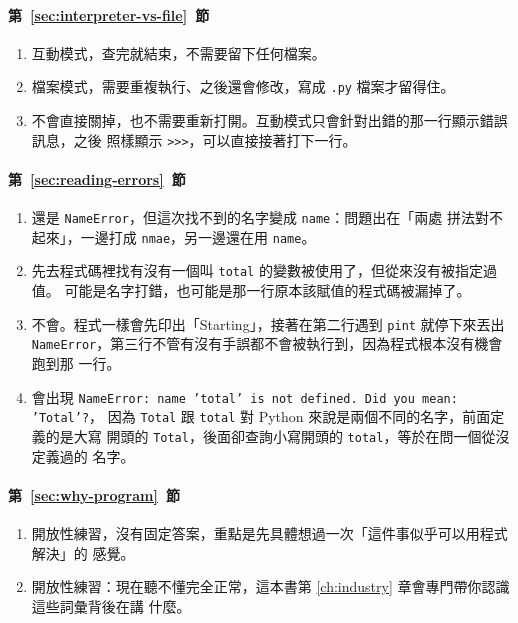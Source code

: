 \paragraph{第~\ref{sec:interpreter-vs-file}~節}
\begin{enumerate}
\item 互動模式，查完就結束，不需要留下任何檔案。
\item 檔案模式，需要重複執行、之後還會修改，寫成 \texttt{.py} 檔案才留得住。
\item 不會直接關掉，也不需要重新打開。互動模式只會針對出錯的那一行顯示錯誤訊息，之後
照樣顯示 \texttt{>>>}，可以直接接著打下一行。
\end{enumerate}

\paragraph{第~\ref{sec:reading-errors}~節}
\begin{enumerate}
\item 還是 \texttt{NameError}，但這次找不到的名字變成 \texttt{name}：問題出在「兩處
拼法對不起來」，一邊打成 \texttt{nmae}，另一邊還在用 \texttt{name}。
\item 先去程式碼裡找有沒有一個叫 \texttt{total} 的變數被使用了，但從來沒有被指定過值。
可能是名字打錯，也可能是那一行原本該賦值的程式碼被漏掉了。
\item 不會。程式一樣會先印出「Starting」，接著在第二行遇到 \texttt{pint} 就停下來丟出
\texttt{NameError}，第三行不管有沒有手誤都不會被執行到，因為程式根本沒有機會跑到那
一行。
\item 會出現 \texttt{NameError: name 'total' is not defined. Did you mean: 'Total'?}，
因為 \texttt{Total} 跟 \texttt{total} 對 Python 來說是兩個不同的名字，前面定義的是大寫
開頭的 \texttt{Total}，後面卻查詢小寫開頭的 \texttt{total}，等於在問一個從沒定義過的
名字。
\end{enumerate}

\paragraph{第~\ref{sec:why-program}~節}
\begin{enumerate}
\item 開放性練習，沒有固定答案，重點是先具體想過一次「這件事似乎可以用程式解決」的
感覺。
\item 開放性練習：現在聽不懂完全正常，這本書第 \ref{ch:industry} 章會專門帶你認識這些詞彙背後在講
什麼。
\end{enumerate}
